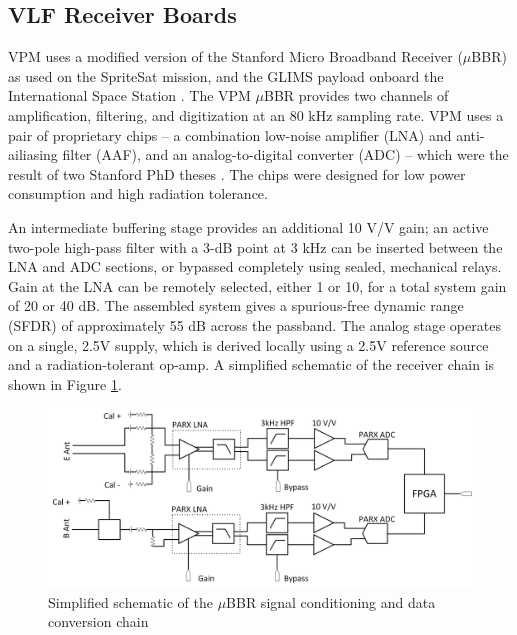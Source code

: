 \subsection{VLF Receiver Boards}
VPM uses a modified version of the Stanford Micro Broadband Receiver ($\mu$BBR) as used on the SpriteSat mission, and the GLIMS payload onboard the International Space Station \citep{Ushio2011}. The VPM $\mu$BBR provides two channels of amplification, filtering, and digitization at an 80 kHz sampling rate. VPM uses a pair of proprietary chips -- a combination low-noise amplifier (LNA) and anti-ailiasing filter (AAF), and an analog-to-digital converter (ADC) -- which were the result of two Stanford PhD theses \citep{Wang2009, Mossawir2009}. The chips were designed for low power consumption and high radiation tolerance.

An intermediate buffering stage provides an additional 10 V/V gain; an active two-pole high-pass filter with a 3-dB point at 3 kHz can be inserted between the LNA and ADC sections, or bypassed completely using sealed, mechanical relays. Gain at the LNA can be remotely selected, either 1 or 10, for a total system gain of 20 or 40 dB. The assembled system gives a spurious-free dynamic range (SFDR) of approximately 55 dB across the passband. The analog stage operates on a single, 2.5V supply, which is derived locally using a 2.5V reference source and a radiation-tolerant op-amp. A simplified schematic of the receiver chain is shown in Figure \ref{fig:ubbr_schem}.

\begin{figure}[t]
\begin{center}
\includegraphics[width=35pc]{figures/vpm_figures/ubbr_schem.png}

\caption{Simplified schematic of the $\mu$BBR signal conditioning and data conversion chain}
\label{fig:ubbr_schem}
\end{center}
\end{figure}

